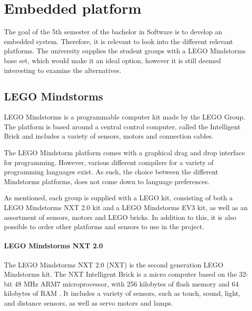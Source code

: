 

\section{Embedded platform}
The goal of the 5th semester of the bachelor in Software is to develop an embedded system.
Therefore, it is relevant to look into the different relevant platforms.
The university supplies the student groups with a LEGO Mindstorms base set, which would make it an ideal option, however it is still deemed interesting to examine the alternatives.

\subsection{LEGO Mindstorms}
LEGO Mindstorms is a programmable computer kit made by the LEGO Group.
The platform is based around a central control computer, called the Intelligent Brick and includes a variety of sensors, motors and connection cables.

The LEGO Mindstorm platform comes with a graphical drag and drop interface for programming.
However, various different compilers for a variety of programming languages exist.
As such, the choice between the different Mindstorms platforms, does not come down to language preferences.

As mentioned, each group is supplied with a LEGO kit, consisting of both a LEGO Mindstorms NXT 2.0 kit and a LEGO Mindstorms EV3 kit, as well as an assortment of sensors, motors and LEGO bricks.
In addition to this, it is also possible to order other platforms and sensors to use in the project.

\paragraph{LEGO Mindstorms NXT 2.0}
The LEGO Mindstorms NXT 2.0 (NXT) is the second generation LEGO Mindstorms kit.
The NXT Intelligent Brick is a micro computer based on the 32-bit 48 MHz ARM7 microprocessor, with 256 kilobytes of flash memory and 64 kilobytes of RAM \cite{nxt2userguide} \cite{nxt2ev3compare}.
It includes a variety of sensors, such as touch, sound, light, and distance sensors, as well as servo motors and lamps.

